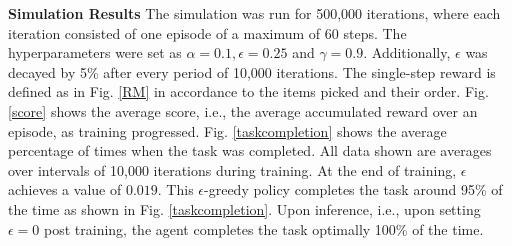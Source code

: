 \documentclass[letterpaper, 10 pt, conference]{ieeeconf}
\begin{document}
\noindent \textbf{Simulation Results}
The simulation was run for 500,000 iterations, where each iteration consisted of one episode of a maximum of 60 steps. The hyperparameters were set as $\alpha=0.1, \epsilon=0.25$ and $ \gamma=0.9$. Additionally, $\epsilon$ was decayed by 5\% after every period of 10,000 iterations. The single-step reward is defined as in Fig. \ref{RM} in accordance to the items picked and their order. Fig. \ref{score} shows the average score, i.e., the average accumulated reward over an episode, as training progressed. Fig. \ref{taskcompletion} shows the average percentage of times when the task was completed. All data shown are averages over intervals of 10,000 iterations during training. At the end of training, $\epsilon$ achieves a value of $0.019$. This $\epsilon$-greedy policy completes the task around 95\% of the time as shown in Fig. \ref{taskcompletion}. Upon inference, i.e., upon setting $\epsilon=0$ post training, the agent completes the task optimally 100\% of the time.
\end{document}
